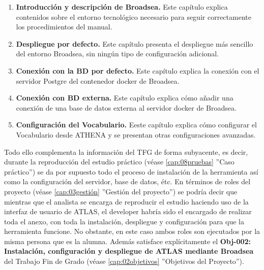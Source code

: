 \begin{enumerate}
    \item \textbf{Introducción y descripción de Broadsea.} Este capítulo explica contenidos sobre el entorno tecnológico necesario para seguir correctamente los procedimientos del manual.
    \item \textbf{Despliegue por defecto.} Este capítulo presenta el despliegue más sencillo del entorno Broadsea, sin ningún tipo de configuración adicional.
    \item \textbf{Conexión con la BD por defecto.} Este capítulo explica la conexión con el servidor Postgre del contenedor docker de Broadsea.
    \item \textbf{Conexión con BD externa.} Este capítulo explica cómo añadir una conexión de una base de datos externa al servidor docker de Broadsea.
    \item \textbf{Configuración del Vocabulario.} Eeste capítulo explica cómo configurar el Vocabulario desde ATHENA y se presentan otras configuraciones avanzadas.
\end{enumerate}

Todo ello complementa la información del TFG de forma subyacente, es decir, durante la reproducción del estudio práctico (véase \ref{cap:08pruebas} ''Caso práctico'') se da por supuesto todo el proceso de instalación de la herramienta así como la configuración del servidor, base de datos, étc. En términos de roles del proyecto (véase \ref{cap:03gestión} ''Gestión del proyecto'') se podría decir que mientras que el analista se encarga de reproducir el estudio haciendo uso de la interfaz de usuario de ATLAS, el developer habría sido el encargado de realizar toda el anexo, con toda la instalación, despliegue y configuración para que la herramienta funcione. No obstante, en este caso ambos roles son ejecutados por la misma persona que es la alumna. Además satisface explícitamente el \textbf{Obj-002: Instalación, configuración y despliegue de ATLAS mediante
Broadsea} del Trabajo Fin de Grado (véase \ref{cap:02objetivos} ''Objetivos del Proyecto'').



